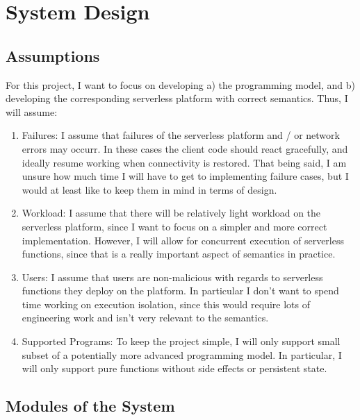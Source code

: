 \documentclass[12pt]{article}
\begin{document}
\section{System Design}

\subsection{Assumptions}

For this project, I want to focus on developing
a) the programming model, and b) developing the corresponding
serverless platform with correct semantics. Thus, I will assume:
\begin{enumerate}
  \item Failures: I assume that failures of the serverless platform
  and / or network errors may occurr. In these cases the client
  code should react gracefully, and ideally resume working when
  connectivity is restored. That being said, I am unsure how much
  time I will have to get to implementing failure cases,
  but I would at least like to keep them in mind in terms of
  design.
  \item Workload: I assume that there will be relatively light
  workload on the serverless platform, since I want to focus
  on a simpler and more correct implementation. However, I
  will allow for concurrent execution of serverless functions,
  since that is a really important aspect of semantics in practice.
  \item Users: I assume that users are non-malicious with regards
  to serverless functions they deploy on the platform.
  In particular I don't want to spend time working on execution
  isolation, since this would require lots of engineering work
  and isn't very relevant to the semantics.
  \item Supported Programs: To keep the project simple, I will
  only support small subset of a potentially more advanced programming model.
  In particular, I will only support pure functions without
  side effects or persistent state.
\end{enumerate}

\subsection{Modules of the System}
\end{document}
